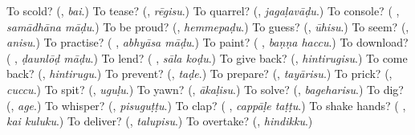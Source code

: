 \begin{tcolorbox}[breakable,colback=teal!4,colframe=teal!35!black,title={Before you move on}]
To scold? (\textbf{}, \emph{bai}.) To tease? (\textbf{}, \emph{rēgisu}.) To quarrel? (\textbf{}, \emph{jagaḷavāḍu}.) To console? (\textbf{ }, \emph{samādhāna māḍu}.) To be proud? (\textbf{}, \emph{hemmepaḍu}.) To guess? (\textbf{}, \emph{ūhisu}.) To seem? (\textbf{}, \emph{anisu}.) To practise? (\textbf{ }, \emph{abhyāsa māḍu}.) To paint? (\textbf{ }, \emph{baṇṇa haccu}.) To download? (\textbf{ }, \emph{ḍaunlōḍ māḍu}.) To lend? (\textbf{ }, \emph{sāla koḍu}.) To give back? (\textbf{}, \emph{hintirugisu}.) To come back? (\textbf{}, \emph{hintirugu}.) To prevent? (\textbf{}, \emph{taḍe}.) To prepare? (\textbf{}, \emph{tayārisu}.) To prick? (\textbf{}, \emph{cuccu}.) To spit? (\textbf{}, \emph{uguḷu}.) To yawn? (\textbf{}, \emph{ākaḷisu}.) To solve? (\textbf{}, \emph{bageharisu}.) To dig? (\textbf{}, \emph{age}.) To whisper? (\textbf{}, \emph{pisuguṭṭu}.) To clap? (\textbf{ }, \emph{cappāḷe taṭṭu}.) To shake hands? (\textbf{ }, \emph{kai kuluku}.) To deliver? (\textbf{}, \emph{talupisu}.) To overtake? (\textbf{}, \emph{hindikku}.)
\end{tcolorbox}
